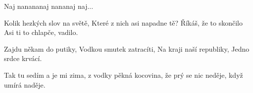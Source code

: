 
\beginchorus{}
Naj nanananaj nananaj naj...      
\endchorus{}

\beginverse{}
Kolik hezkých slov na světě,
Které z nich asi napadne tě?
Říkáš, že to skončilo
Asi ti to chlapče, vadilo.
\endverse{}

\beginchorus{}
\phantom{}
\endchorus{}

\beginverse{}
Zajdu někam do putiky,
Vodkou smutek zatracíti,
Na kraji naší republiky,
Jedno srdce krvácí.
\endverse{}

\beginchorus{}
\phantom{}
\endchorus{}

\beginverse{}
Tak tu sedím a je mi zima,
z vodky pěkná kocovina,
že prý se nic neděje,
když umírá naděje.
\endverse{}

\beginchorus{}
\phantom{}
\endchorus{}

\endsong{}
